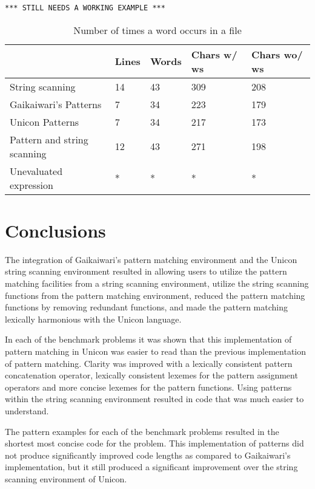 \documentclass{article}
\begin{document}
\begin{verbatim}
*** STILL NEEDS A WORKING EXAMPLE ***
\end{verbatim}

\begin{table}[ht]
	\caption{Number of times a word occurs in a file}
	\centering
	\begin{tabular}{|l|l|l|l|l|}
		\hline\hline
		 & Lines & Words & Chars w/ ws & Chars wo/ ws\\
		\hline
		String scanning & 14 & 43 & 309 & 208 \\
		Gaikaiwari's Patterns & 7 & 34 & 223 & 179 \\
		Unicon Patterns & 7 & 34 & 217 & 173 \\
		Pattern and string scanning & 12 & 43 & 271 & 198 \\
		Unevaluated expression & * & * & * & * \\
		\hline
	\end{tabular}
\end{table}


\section{Conclusions}
The integration of Gaikaiwari's pattern matching environment and the Unicon string scanning environment resulted in allowing users to utilize the pattern matching facilities from a string scanning environment, utilize the string scanning functions from the pattern matching environment, reduced the pattern matching functions by removing redundant functions, and made the pattern matching lexically harmonious with the Unicon language.

In each of the benchmark problems it was shown that this implementation of pattern matching in Unicon was easier to read than the previous implementation of pattern matching.  Clarity was improved with a lexically consistent pattern concatenation operator, lexically consistent lexemes for the pattern assignment operators and more concise lexemes for the pattern functions.  Using patterns within the string scanning environment resulted in code that was much easier to understand.

The pattern examples for each of the benchmark problems resulted in the shortest most concise code for the problem.  This implementation of patterns did not produce significantly improved code lengths as compared to Gaikaiwari's implementation, but it still produced a significant improvement over the string scanning environment of Unicon.
\end{document}
